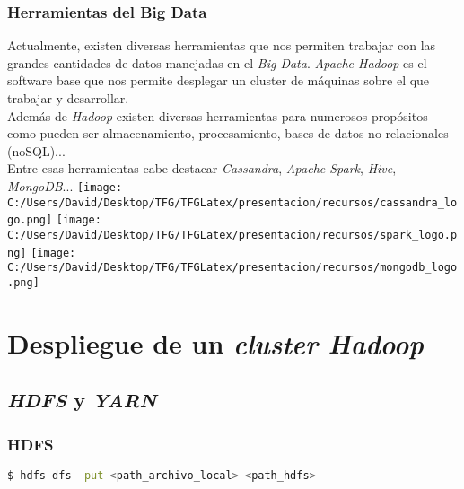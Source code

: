 \documentclass{beamer}
\begin{document}
\begin{frame} %
  \frametitle{Herramientas del Big Data}
  Actualmente, existen diversas herramientas que nos permiten trabajar con las grandes cantidades de datos
  manejadas en el \textit{Big Data}. \textit{Apache Hadoop} es el software base que nos permite desplegar
  un cluster de máquinas sobre el que trabajar y desarrollar.\\
  Además de \textit{Hadoop} existen diversas herramientas para numerosos propósitos como pueden ser almacenamiento,
  procesamiento, bases de datos no relacionales (noSQL)...\\
  Entre esas herramientas cabe destacar \textit{Cassandra}, \textit{Apache Spark}, \textit{Hive}, \textit{MongoDB}...
  \texttt{[image: C:/Users/David/Desktop/TFG/TFGLatex/presentacion/recursos/cassandra\_logo.png]}%
  \texttt{[image: C:/Users/David/Desktop/TFG/TFGLatex/presentacion/recursos/spark\_logo.png]}%
  \texttt{[image: C:/Users/David/Desktop/TFG/TFGLatex/presentacion/recursos/mongodb\_logo.png]}
\end{frame}

\section{Despliegue de un \textit{cluster Hadoop}}

\subsection{\textit{HDFS} y \textit{YARN}}

\begin{frame}[fragile]
\frametitle{HDFS}
\begin{lstlisting}[language=bash, numbers=none, frame=single]
$ hdfs dfs -put <path_archivo_local> <path_hdfs>
\end{lstlisting}
\end{frame}

\end{document}
